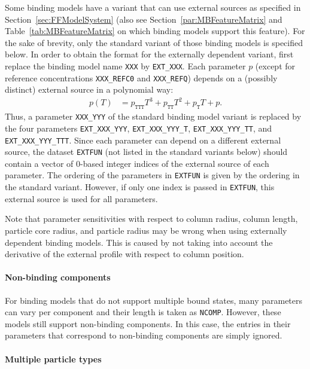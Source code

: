 Some binding models have a variant that can use external sources as specified in Section~\ref{sec:FFModelSystem} (also see Section~\ref{par:MBFeatureMatrix} and Table~\ref{tab:MBFeatureMatrix} on which binding models support this feature).
For the sake of brevity, only the standard variant of those binding models is specified below.
In order to obtain the format for the externally dependent variant, first replace the binding model name \texttt{XXX} by \texttt{EXT\_XXX}.
Each parameter $p$ (except for reference concentrations \texttt{XXX\_REFC0} and \texttt{XXX\_REFQ}) depends on a (possibly distinct) external source in a polynomial way:
\begin{align*}
  p(T) &= p_{\texttt{TTT}} T^3 + p_{\texttt{TT}} T^2 + p_{\texttt{T}} T + p.
\end{align*}
Thus, a parameter \texttt{XXX\_YYY} of the standard binding model variant is replaced by the four parameters \texttt{EXT\_XXX\_YYY}, \texttt{EXT\_XXX\_YYY\_T}, \texttt{EXT\_XXX\_YYY\_TT}, and \texttt{EXT\_XXX\_YYY\_TTT}.
Since each parameter can depend on a different external source, the dataset \texttt{EXTFUN} (not listed in the standard variants below) should contain a vector of 0-based integer indices of the external source of each parameter.
The ordering of the parameters in \texttt{EXTFUN} is given by the ordering in the standard variant.
However, if only one index is passed in \texttt{EXTFUN}, this external source is used for all parameters.

Note that parameter sensitivities with respect to column radius, column length, particle core radius, and particle radius may be wrong when using externally dependent binding models.
This is caused by not taking into account the derivative of the external profile with respect to column position.

\paragraph{Non-binding components}

For binding models that do not support multiple bound states, many parameters can vary per component and their length is taken as \texttt{NCOMP}.
However, these models still support non-binding components.
In this case, the entries in their parameters that correspond to non-binding components are simply ignored.

\paragraph{Multiple particle types}

